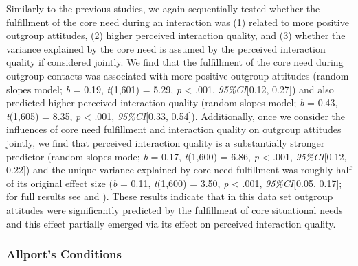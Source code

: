 Similarly to the previous studies, we again sequentially tested whether
the fulfillment of the core need during an interaction was (1) related
to more positive outgroup attitudes, (2) higher perceived interaction
quality, and (3) whether the variance explained by the core need is
assumed by the perceived interaction quality if considered jointly. We
find that the fulfillment of the core need during outgroup contacts was
associated with more positive outgroup attitudes (random slopes model;
\textit{b} = 0.19, \textit{t}(1,601) = 5.29, \textit{p} \textless{}
.001, \textit{95\%CI}{[}0.12, 0.27{]}) and also predicted higher
perceived interaction quality (random slopes model; \textit{b} = 0.43,
\textit{t}(1,605) = 8.35, \textit{p} \textless{} .001,
\textit{95\%CI}{[}0.33, 0.54{]}). Additionally, once we consider the
influences of core need fulfillment and interaction quality on outgroup
attitudes jointly, we find that perceived interaction quality is a
substantially stronger predictor (random slopes mode; \textit{b} = 0.17,
\textit{t}(1,600) = 6.86, \textit{p} \textless{} .001,
\textit{95\%CI}{[}0.12, 0.22{]}) and the unique variance explained by
core need fulfillment was roughly half of its original effect size
(\textit{b} = 0.11, \textit{t}(1,600) = 3.50, \textit{p} \textless{}
.001, \textit{95\%CI}{[}0.05, 0.17{]}; for full results see
 and
). These results indicate that in
this data set outgroup attitudes were significantly predicted by the
fulfillment of core situational needs and this effect partially emerged
via its effect on perceived interaction quality.

\subsubsection{Allport's Conditions}

